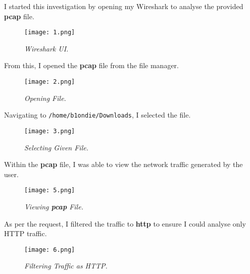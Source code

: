 I started this investigation by opening my Wireshark to analyse the provided \textbf{pcap} file.

\begin{figure}[H]
    \setlength{\abovecaptionskip}{20pt}
    \setlength{\belowcaptionskip}{0pt}
    \centering
    \texttt{[image: 1.png]}
    \captionsetup{justification=centering}
    \caption{\textit{Wireshark UI.}}
    \label{fig:1}
\end{figure}
\vspace{-10pt}

From this, I opened the \textbf{pcap} file from the file manager.

\begin{figure}[H]
    \setlength{\abovecaptionskip}{20pt}
    \setlength{\belowcaptionskip}{0pt}
    \centering
    \texttt{[image: 2.png]}
    \captionsetup{justification=centering}
    \caption{\textit{Opening File.}}
    \label{fig:2}
\end{figure}
\vspace{-10pt}

Navigating to \texttt{/home/b1ondie/Downloads}, I selected the file.

\begin{figure}[H]
    \setlength{\abovecaptionskip}{20pt}
    \setlength{\belowcaptionskip}{0pt}
    \centering
    \texttt{[image: 3.png]}
    \captionsetup{justification=centering}
    \caption{\textit{Selecting Given File.}}
    \label{fig:3}
\end{figure}
\vspace{-10pt}

Within the \textbf{pcap} file, I was able to view the network traffic generated by the user.

\begin{figure}[H]
    \setlength{\abovecaptionskip}{20pt}
    \setlength{\belowcaptionskip}{0pt}
    \centering
    \texttt{[image: 5.png]}
    \captionsetup{justification=centering}
    \caption{\textit{Viewing \textbf{pcap} File.}}
    \label{fig:5}
\end{figure}
\vspace{-10pt}

As per the request, I filtered the traffic to \textbf{http} to ensure I could analyse only HTTP traffic.

\begin{figure}[H]
    \setlength{\abovecaptionskip}{20pt}
    \setlength{\belowcaptionskip}{0pt}
    \centering
    \texttt{[image: 6.png]}
    \captionsetup{justification=centering}
    \caption{\textit{Filtering Traffic as HTTP.}}
    \label{fig:6}
\end{figure}
\vspace{-10pt}

